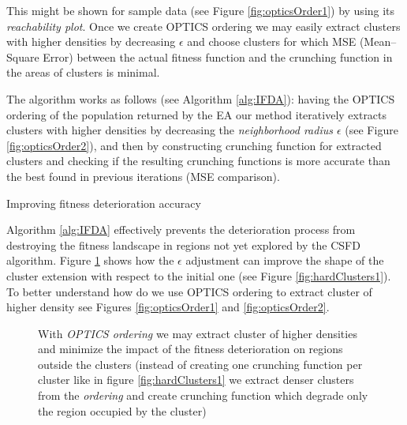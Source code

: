 This might be shown for sample data (see Figure \ref{fig:opticsOrder1}) by using its
\textit{reachability plot}. Once we create OPTICS ordering
we may easily extract clusters with higher densities by decreasing
$\epsilon$ and choose clusters for which MSE (Mean--Square Error) 
between the actual fitness function and the crunching function in the 
areas of clusters is minimal.

The algorithm works as follows (see Algorithm \ref{alg:IFDA}): 
having the OPTICS ordering
of the population returned by the EA our method iteratively extracts 
clusters with higher densities by decreasing the \textit{neighborhood radius $\epsilon$} 
(see Figure \ref{fig:opticsOrder2}), and then by constructing crunching
function for extracted clusters and checking if the resulting crunching functions is more accurate than the best found in previous iterations (MSE comparison).

\begin{algorithm}
\caption{Improving fitness deterioration accuracy}
\label{alg:IFDA}
\begin{algorithmic}[1]
	\ENDIF
\ENDWHILE
\end{algorithmic}
\end{algorithm}

Algorithm \ref{alg:IFDA} effectively prevents the deterioration process
from destroying the fitness landscape in regions not yet explored by
the CSFD algorithm. 
Figure \ref{fig:hardClusters2} shows how the $\epsilon$
adjustment can improve the shape of the cluster extension
with respect to the initial one (see Figure \ref{fig:hardClusters1}).
To better understand how do we 
use OPTICS ordering to extract cluster of higher density see
Figures \ref{fig:opticsOrder1} and \ref{fig:opticsOrder2}.

\begin{figure}
  \centering
  \caption{With \textit{OPTICS ordering} we may extract cluster of higher
  densities and minimize the impact of the fitness deterioration on regions
  outside the clusters (instead of creating one crunching function per cluster 
  like in figure \ref{fig:hardClusters1} we extract denser clusters from the
  \textit{ordering} and create crunching function which degrade only 
  the region occupied by the cluster)}
  \label{fig:hardClusters2}
\end{figure}



